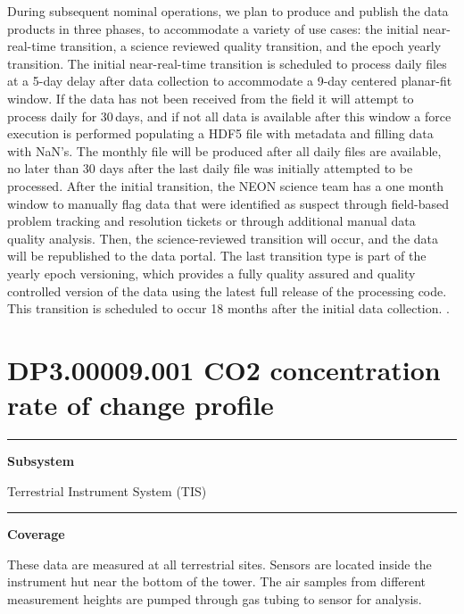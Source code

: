 \documentclass[]{article}
\begin{document}
During subsequent nominal operations, we plan to produce and publish the
data products in three phases, to accommodate a variety of use cases:
the initial near-real-time transition, a science reviewed quality
transition, and the epoch yearly transition. The initial near-real-time
transition is scheduled to process daily files at a 5-day delay after
data collection to accommodate a 9-day centered planar-fit window. If
the data has not been received from the field it will attempt to process
daily for 30\,days, and if not all data is available after this window a
force execution is performed populating a HDF5 file with metadata and
filling data with NaN's. The monthly file will be produced after all
daily files are available, no later than 30 days after the last daily
file was initially attempted to be processed. After the initial
transition, the NEON science team has a one month window to manually
flag data that were identified as suspect through field-based problem
tracking and resolution tickets or through additional manual data
quality analysis. Then, the science-reviewed transition will occur, and
the data will be republished to the data portal. The last transition
type is part of the yearly epoch versioning, which provides a fully
quality assured and quality controlled version of the data using the
latest full release of the processing code. This transition is scheduled
to occur 18 months after the initial data collection. \newpage
.

\section{DP3.00009.001 CO2 concentration rate of change
profile}\label{dp3.00009.001-co2-concentration-rate-of-change-profile}

\begin{center}\rule{0.5\linewidth}{\linethickness}\end{center}

\textbf{Subsystem}

Terrestrial Instrument System (TIS)

\begin{center}\rule{0.5\linewidth}{\linethickness}\end{center}

\textbf{Coverage}

These data are measured at all terrestrial sites. Sensors are located
inside the instrument hut near the bottom of the tower. The air samples
from different measurement heights are pumped through gas tubing to
sensor for analysis.
\end{document}
